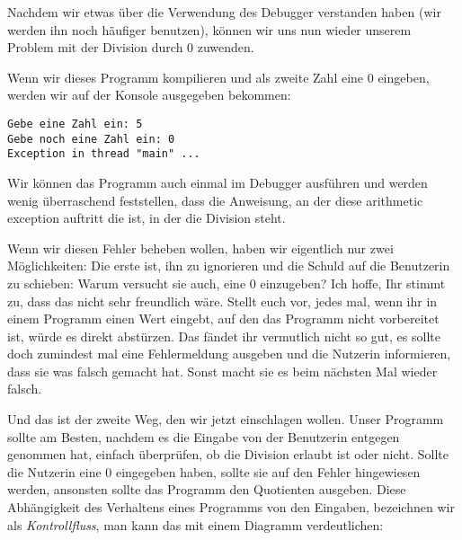 
Nachdem wir etwas über die Verwendung des Debugger verstanden haben (wir werden
ihn noch häufiger benutzen), können wir uns nun wieder unserem Problem mit der
Division durch 0 zuwenden.


Wenn wir dieses Programm kompilieren und als zweite Zahl eine 0 eingeben, werden
wir auf der Konsole ausgegeben bekommen:
\begin{verbatim}
Gebe eine Zahl ein: 5
Gebe noch eine Zahl ein: 0
Exception in thread "main" ...
\end{verbatim}

Wir können das Programm auch einmal im Debugger ausführen und werden wenig
überraschend feststellen, dass die Anweisung, an der diese arithmetic exception
auftritt die ist, in der die Division steht.

Wenn wir diesen Fehler beheben wollen, haben wir eigentlich nur zwei
Möglichkeiten: Die erste ist, ihn zu ignorieren und die Schuld auf die
Benutzerin zu schieben: Warum versucht sie auch, eine 0 einzugeben? Ich hoffe,
Ihr stimmt zu, dass das nicht sehr freundlich wäre. Stellt euch vor, jedes mal,
wenn ihr in einem Programm einen Wert eingebt, auf den das Programm nicht
vorbereitet ist, würde es direkt abstürzen. Das fändet ihr vermutlich nicht so
gut, es sollte doch zumindest mal eine Fehlermeldung ausgeben und die Nutzerin
informieren, dass sie was falsch gemacht hat. Sonst macht sie es beim nächsten
Mal wieder falsch.

Und das ist der zweite Weg, den wir jetzt einschlagen wollen. Unser Programm
sollte am Besten, nachdem es die Eingabe von der Benutzerin entgegen genommen
hat, einfach überprüfen, ob die Division erlaubt ist oder nicht. Sollte die
Nutzerin eine 0 eingegeben haben, sollte sie auf den Fehler hingewiesen werden,
ansonsten sollte das Programm den Quotienten ausgeben. Diese Abhängigkeit des
Verhaltens eines Programms von den Eingaben, bezeichnen wir als
\emph{Kontrollfluss}, man kann das mit einem Diagramm verdeutlichen:

\begin{center}
\end{center}

